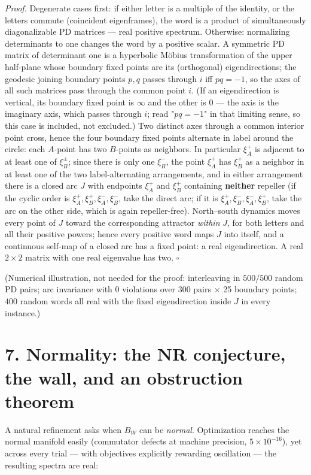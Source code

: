 \documentclass[11pt]{article}
\begin{document}
\emph{Proof.}  Degenerate cases first: if either letter is a multiple of the identity, or the letters commute (coincident eigenframes), the word is a product of simultaneously diagonalizable PD matrices — real positive spectrum.  Otherwise: normalizing determinants to one changes the word by a positive scalar.  A symmetric PD matrix of determinant one is a hyperbolic Möbius transformation of the upper half-plane whose boundary fixed points are its (orthogonal) eigendirections; the geodesic joining boundary points $p, q$ passes through $i$ iff $pq = -1$, so the axes of all such matrices pass through the common point $i$.  (If an eigendirection is vertical, its boundary fixed point is $\infty$ and the other is $0$ — the axis is the imaginary axis, which passes through $i$; read "$pq = -1$" in that limiting sense, so this case is included, not excluded.)  Two distinct axes through a common interior point cross, hence the four boundary fixed points alternate in label around the circle: each $A$-point has two $B$-points as neighbors.  In particular $\xi_A^+$ is adjacent to at least one of $\xi_B^\pm$; since there is only one $\xi_B^-$, the point $\xi_A^+$ has $\xi_B^+$ as a neighbor in at least one of the two label-alternating arrangements, and in either arrangement there is a closed arc $J$ with endpoints $\xi_A^+$ and $\xi_B^+$ containing \textbf{neither} repeller (if the cyclic order is $\xi_A^+, \xi_B^+, \xi_A^-, \xi_B^-$, take the direct arc; if it is $\xi_A^+, \xi_B^-, \xi_A^-, \xi_B^+$, take the arc on the other side, which is again repeller-free).  North–south dynamics moves every point of $J$ toward the corresponding attractor \emph{within} $J$, for both letters and all their positive powers; hence every positive word maps $J$ into itself, and a continuous self-map of a closed arc has a fixed point: a real eigendirection.  A real $2\times 2$ matrix with one real eigenvalue has two.  $\square$

(Numerical illustration, not needed for the proof: interleaving in $500/500$ random PD pairs; arc invariance with $0$ violations over $300$ pairs $\times$ 25 boundary points; $400$ random words all real with the fixed eigendirection inside $J$ in every instance.)

\section*{7. Normality: the NR conjecture, the wall, and an obstruction theorem}
A natural refinement asks when $B_W$ can be \emph{normal}.  Optimization reaches the normal manifold easily (commutator defects at machine precision, $5\times 10^{-16}$), yet across every trial — with objectives explicitly rewarding oscillation — the resulting spectra are real:
\end{document}
